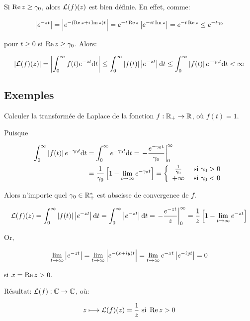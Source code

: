 \begin{remark}
    Si $\operatorname{Re} z \geq \gamma_0$, alors $\mathcal{L}(f)(z)$ est bien définie.
    En effet, comme:
    
    \[ \left|e^{-zt}\right| = \left|e^{-(\operatorname{Re} z + i \operatorname{Im} z) t}\right| = e^{-t \operatorname{Re} z} \left|e^{-i t \operatorname{Im} z}\right| = e^{-t\operatorname{Re} z} \leq e^{-t\gamma_0} \]
    
    pour $t \geq 0$ si $\operatorname{Re} z \geq \gamma_0$.
    Alors:
    
    \[ \left|\mathcal{L}(f)(z)\right| = \left|\int_0^\infty f(t) e^{-zt} \mathrm{d}t\right| \leq \int_0^\infty \left|f(t)\right| \left|e^{-zt}\right| \mathrm{d}t \leq \int_0^\infty \left|f(t)\right| e^{-\gamma_0 t} \mathrm{d}t < \infty \]
\end{remark}

\subsection{Exemples}

\begin{example}[1]
    Calculer la transformée de Laplace de la fonction $f: \mathbb{R}_+ \rightarrow \mathbb{R}$, où $f(t) = 1$.

Puisque

\begin{align*}
    \int_0^\infty \left|f(t)\right| e^{-\gamma_0 t} \mathrm{d}t
    &= \int_0^\infty e^{-\gamma_0 t} \mathrm{d}t
    = \left.-\frac{e^{-\gamma_0 t}}{\gamma_0}\right|_0^\infty
    \\&= \frac{1}{\gamma_0} \left[1 - \lim_{t \rightarrow \infty} e^{-\gamma_0 t}\right]
    = \left\{
    \begin{array}{clc}
    \frac{1}{\gamma_0} & \textrm{ si } \gamma_0 > 0\\
    +\infty & \textrm{ si } \gamma_0 < 0
    \end{array}\right.
\end{align*}

Alors n'importe quel $\gamma_0 \in \mathbb{R}_+^\ast$ est abscisse de convergence de $f$.

\[
    \mathcal{L}(f)(z)
    = \int_0^\infty \left|f(t)\right| \left|e^{-zt}\right| \mathrm{d}t
    = \int_0^\infty \left|e^{-zt}\right| \mathrm{d}t
    = \left.-\frac{e^{-z t}}{z}\right|_0^\infty
    = \frac{1}{z} \left[1 - \lim_{t \rightarrow \infty} e^{-z t}\right]
\]

Or,

\[
    \lim_{t \rightarrow \infty} \left|e^{-zt}\right|
    = \lim_{t \rightarrow \infty} \left|e^{-(x + iy)t}\right|
    = \lim_{t \rightarrow \infty} e^{-xt} \left|e^{-iyt}\right|
    = 0
\]

si $x = \operatorname{Re} z > 0$.

Résultat: $\mathcal{L}(f): \mathbb{C} \rightarrow \mathbb{C}$, où:

\[
    z \longmapsto \mathcal{L}(f)(z) = \frac{1}{z} \textrm{ si } \operatorname{Re} z > 0
\]
\end{example}


